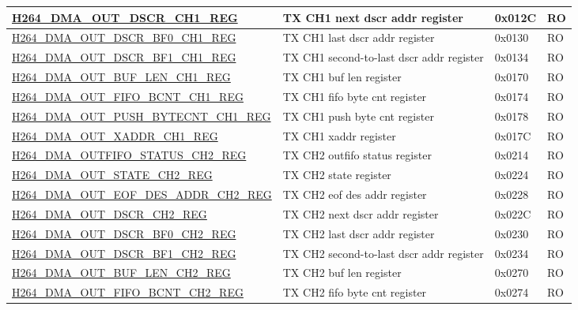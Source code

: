 \begin{longtable}{ | p{7.5cm} | p{5.7cm} | p{1.2cm} | p{1cm} | }
    \hyperref[regdesc:H264DMAOUTDSCRCH1REG]{H264\_DMA\_OUT\_DSCR\_CH1\_REG} & TX CH1 next dscr addr register & 0x012C & RO \\ \hline
    \hyperref[regdesc:H264DMAOUTDSCRBF0CH1REG]{H264\_DMA\_OUT\_DSCR\_BF0\_CH1\_REG} & TX CH1 last dscr addr register & 0x0130 & RO \\ \hline
    \hyperref[regdesc:H264DMAOUTDSCRBF1CH1REG]{H264\_DMA\_OUT\_DSCR\_BF1\_CH1\_REG} & TX CH1 second-to-last dscr addr register & 0x0134 & RO \\ \hline
    \hyperref[regdesc:H264DMAOUTBUFLENCH1REG]{H264\_DMA\_OUT\_BUF\_LEN\_CH1\_REG} & TX CH1 buf len register & 0x0170 & RO \\ \hline
    \hyperref[regdesc:H264DMAOUTFIFOBCNTCH1REG]{H264\_DMA\_OUT\_FIFO\_BCNT\_CH1\_REG} & TX CH1 fifo byte cnt register & 0x0174 & RO \\ \hline
    \hyperref[regdesc:H264DMAOUTPUSHBYTECNTCH1REG]{H264\_DMA\_OUT\_PUSH\_BYTECNT\_CH1\_REG} & TX CH1 push byte cnt register & 0x0178 & RO \\ \hline
    \hyperref[regdesc:H264DMAOUTXADDRCH1REG]{H264\_DMA\_OUT\_XADDR\_CH1\_REG} & TX CH1 xaddr register & 0x017C & RO \\ \hline
    \hyperref[regdesc:H264DMAOUTFIFOSTATUSCH2REG]{H264\_DMA\_OUTFIFO\_STATUS\_CH2\_REG} & TX CH2 outfifo status register & 0x0214 & RO \\ \hline
    \hyperref[regdesc:H264DMAOUTSTATECH2REG]{H264\_DMA\_OUT\_STATE\_CH2\_REG} & TX CH2 state register & 0x0224 & RO \\ \hline
    \hyperref[regdesc:H264DMAOUTEOFDESADDRCH2REG]{H264\_DMA\_OUT\_EOF\_DES\_ADDR\_CH2\_REG} & TX CH2 eof des addr register & 0x0228 & RO \\ \hline
    \hyperref[regdesc:H264DMAOUTDSCRCH2REG]{H264\_DMA\_OUT\_DSCR\_CH2\_REG} & TX CH2 next dscr addr register & 0x022C & RO \\ \hline
    \hyperref[regdesc:H264DMAOUTDSCRBF0CH2REG]{H264\_DMA\_OUT\_DSCR\_BF0\_CH2\_REG} & TX CH2 last dscr addr register & 0x0230 & RO \\ \hline
    \hyperref[regdesc:H264DMAOUTDSCRBF1CH2REG]{H264\_DMA\_OUT\_DSCR\_BF1\_CH2\_REG} & TX CH2 second-to-last dscr addr register & 0x0234 & RO \\ \hline
    \hyperref[regdesc:H264DMAOUTBUFLENCH2REG]{H264\_DMA\_OUT\_BUF\_LEN\_CH2\_REG} & TX CH2 buf len register & 0x0270 & RO \\ \hline
    \hyperref[regdesc:H264DMAOUTFIFOBCNTCH2REG]{H264\_DMA\_OUT\_FIFO\_BCNT\_CH2\_REG} & TX CH2 fifo byte cnt register & 0x0274 & RO \\ \hline

\end{longtable}
